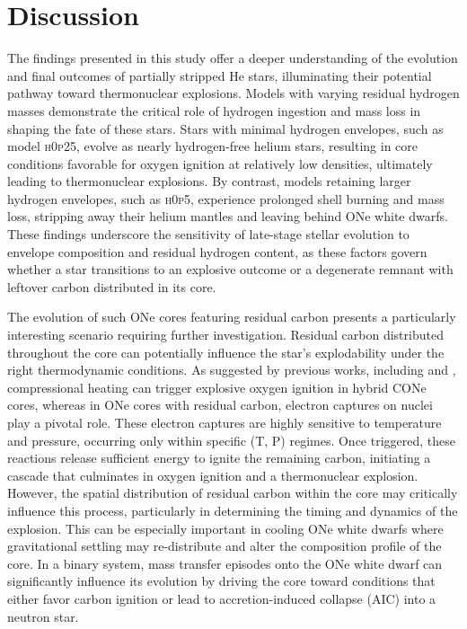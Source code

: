 \documentclass[main.tex]{subfiles}
\begin{document}
    \section{Discussion}\label{sec:ch3:discussion}
    The findings presented in this study offer a deeper understanding of the evolution and final outcomes of partially stripped He stars, illuminating their potential pathway toward thermonuclear explosions. Models with varying residual hydrogen masses demonstrate the critical role of hydrogen ingestion and mass loss in shaping the fate of these stars. Stars with minimal hydrogen envelopes, such as model \textsc{h0p25}, evolve as nearly hydrogen-free helium stars, resulting in core conditions favorable for oxygen ignition at relatively low densities, ultimately leading to thermonuclear explosions. By contrast, models retaining larger hydrogen envelopes, such as \textsc{h0p5}, experience prolonged shell burning and mass loss, stripping away their helium mantles and leaving behind ONe white dwarfs. These findings underscore the sensitivity of late-stage stellar evolution to envelope composition and residual hydrogen content, as these factors govern whether a star transitions to an explosive outcome or a degenerate remnant with leftover carbon distributed in its core.
    
    The evolution of such ONe cores featuring residual carbon presents a particularly interesting scenario requiring further investigation. Residual carbon distributed throughout the core can potentially influence the star’s explodability under the right thermodynamic conditions. As suggested by previous works, including \cite{AC20} and \cite{CA22}, compressional heating can trigger explosive oxygen ignition in hybrid CONe cores, whereas in ONe cores with residual carbon, electron captures on  nuclei play a pivotal role. These electron captures are highly sensitive to temperature and pressure, occurring only within specific (T, P) regimes. Once triggered, these reactions release sufficient energy to ignite the remaining carbon, initiating a cascade that culminates in oxygen ignition and a thermonuclear explosion. However, the spatial distribution of residual carbon within the core may critically influence this process, particularly in determining the timing and dynamics of the explosion. This can be especially important in cooling ONe white dwarfs where gravitational settling may re-distribute and alter the composition profile of the core. 
    In a binary system, mass transfer episodes onto the ONe white dwarf can significantly influence its evolution by driving the core toward conditions that either favor carbon ignition or lead to accretion-induced collapse (AIC) into a neutron star. 
    
\end{document}
